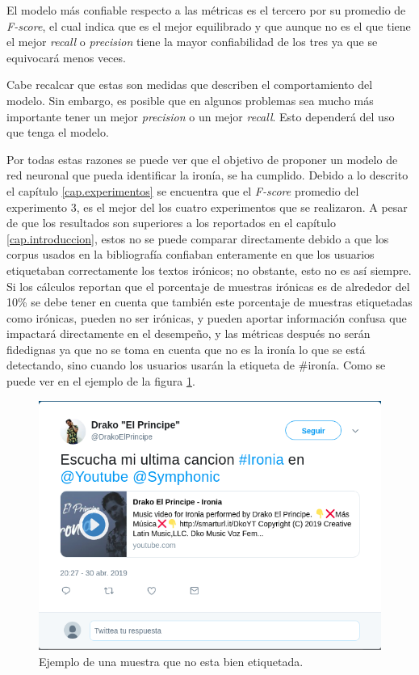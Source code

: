 \par El modelo más confiable respecto a las métricas es el tercero por su  promedio de \textit{F-score}, el cual indica que es el mejor equilibrado y que aunque  no es el que tiene el mejor \textit{recall} o \textit{precision} tiene la mayor confiabilidad de los tres ya que se equivocará menos veces.

\par Cabe recalcar que estas son medidas que describen el comportamiento del modelo. Sin embargo, es posible que en algunos problemas sea mucho más importante tener un mejor \textit{precision} o un mejor \textit{recall}. Esto dependerá del uso que tenga el modelo.

\par Por todas estas razones se puede ver que el objetivo de proponer un modelo de red neuronal que pueda identificar la ironía, se ha cumplido. Debido a lo descrito el capítulo \ref{cap.experimentos} se encuentra que el \textit{F-score} promedio del experimento 3, es el mejor del los cuatro experimentos que se realizaron. A pesar de que los resultados son superiores a los reportados en el capítulo \ref{cap.introduccion}, estos no se puede comparar directamente debido a que los corpus usados en la bibliografía confiaban enteramente en que los usuarios etiquetaban correctamente los textos irónicos; no obstante, esto no es así siempre. Si los cálculos reportan que el porcentaje de muestras irónicas es de alrededor del 10\% se debe tener en cuenta que también este porcentaje de muestras etiquetadas como irónicas, pueden no ser irónicas, y pueden aportar información confusa que impactará directamente en el desempeño, y las métricas después no serán fidedignas ya que no se toma en cuenta que no es la ironía lo que se está detectando, sino cuando los usuarios usarán la etiqueta de \#ironía. Como se puede ver en el ejemplo de la figura \ref{fig:ejemploNoironia}.
\begin{figure}
	\centering
	\includegraphics[width=0.6\linewidth]{imagenes/ejemploIroniaNoironia.png}
	\caption{Ejemplo de una muestra que no esta bien etiquetada.}
	\label{fig:ejemploNoironia}
\end{figure}

